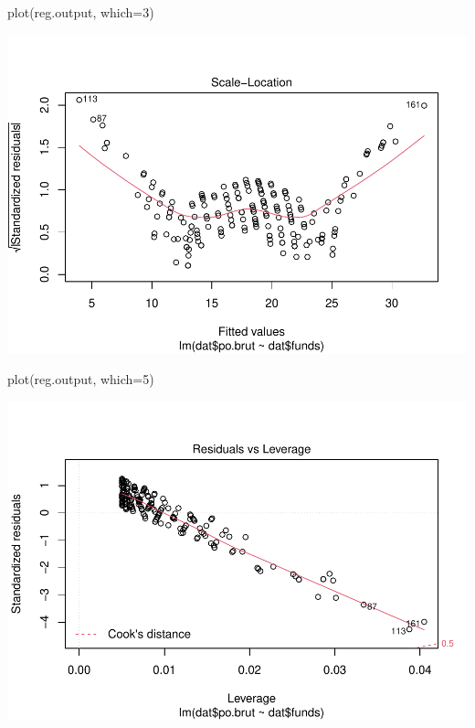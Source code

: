 \documentclass[
]{article}
\newenvironment{Shaded}{\begin{snugshade}}{\end{snugshade}}
\newcommand{\AttributeTok}[1]{\textcolor[rgb]{0.77,0.63,0.00}{#1}}
\newcommand{\DecValTok}[1]{\textcolor[rgb]{0.00,0.00,0.81}{#1}}
\newcommand{\FunctionTok}[1]{\textcolor[rgb]{0.00,0.00,0.00}{#1}}
\newcommand{\NormalTok}[1]{#1}
\begin{document}
\begin{Shaded}
\begin{Highlighting}[]
\FunctionTok{plot}\NormalTok{(reg.output, }\AttributeTok{which=}\DecValTok{3}\NormalTok{)}
\end{Highlighting}
\end{Shaded}

\includegraphics{Journal_files/figure-latex/unnamed-chunk-34-4.pdf}

\begin{Shaded}
\begin{Highlighting}[]
\FunctionTok{plot}\NormalTok{(reg.output, }\AttributeTok{which=}\DecValTok{5}\NormalTok{)}
\end{Highlighting}
\end{Shaded}

\includegraphics{Journal_files/figure-latex/unnamed-chunk-34-5.pdf}
\end{document}
